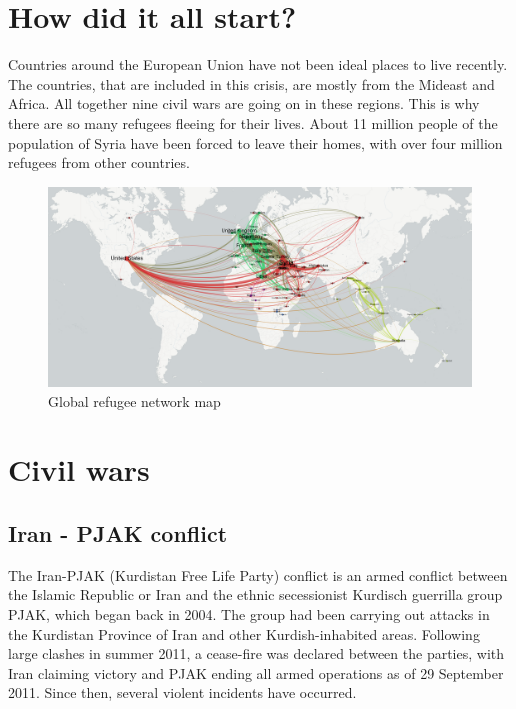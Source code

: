 
\section{How did it all start?}

Countries around the European Union have not been ideal places to live recently. The countries, that are included in this crisis, are mostly from the Mideast and Africa. All together nine civil wars are going on in these regions. This is why there are so many refugees fleeing for their lives. About 11 million people of the population of Syria have been forced to leave their homes, with over four million refugees from other countries.

\begin{figure}[!h]
	\begin{center}
		\includegraphics[width=\linewidth]{images/global-refugee-network-geo}
		\caption{Global refugee network map}
	\end{center}
\end{figure}

\newpage
\section{Civil wars}

\subsection{Iran - PJAK conflict}
The Iran-PJAK (Kurdistan Free Life Party) conflict is an armed conflict between the Islamic Republic or Iran and the ethnic secessionist Kurdisch guerrilla group PJAK, which began back in 2004. The group had been carrying out attacks in the Kurdistan Province of Iran and other Kurdish-inhabited areas. Following large clashes in summer 2011, a cease-fire was declared between the parties, with Iran claiming victory and PJAK ending all armed operations as of 29 September 2011. Since then, several violent incidents have occurred.

